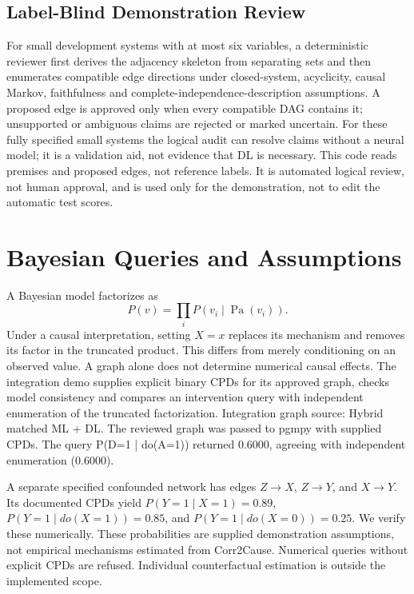 \documentclass[conference]{IEEEtran}
\begin{document}
\subsection{Label-Blind Demonstration Review}
For small development systems with at most six variables, a deterministic reviewer first derives the adjacency skeleton from separating sets and then enumerates compatible edge directions under closed-system, acyclicity, causal Markov, faithfulness and complete-independence-description assumptions. A proposed edge is approved only when every compatible DAG contains it; unsupported or ambiguous claims are rejected or marked uncertain. For these fully specified small systems the logical audit can resolve claims without a neural model; it is a validation aid, not evidence that DL is necessary. This code reads premises and proposed edges, not reference labels. It is automated logical review, not human approval, and is used only for the demonstration, not to edit the automatic test scores.

\section{Bayesian Queries and Assumptions}
A Bayesian model factorizes as
\begin{equation}
P(v)=\prod_i P(v_i\mid \operatorname{Pa}(v_i)).
\end{equation}
Under a causal interpretation, setting $X=x$ replaces its mechanism and removes its factor in the truncated product. This differs from merely conditioning on an observed value. A graph alone does not determine numerical causal effects. The integration demo supplies explicit binary CPDs for its approved graph, checks model consistency and compares an intervention query with independent enumeration of the truncated factorization. Integration graph source: Hybrid matched ML + DL.  The reviewed graph was passed to pgmpy with supplied CPDs. The query P(D=1 | do(A=1)) returned 0.6000, agreeing with independent enumeration (0.6000).

A separate specified confounded network has edges $Z\rightarrow X$, $Z\rightarrow Y$, and $X\rightarrow Y$. Its documented CPDs yield $P(Y=1\mid X=1)=0.89$, $P(Y=1\mid do(X=1))=0.85$, and $P(Y=1\mid do(X=0))=0.25$. We verify these numerically. These probabilities are supplied demonstration assumptions, not empirical mechanisms estimated from Corr2Cause. Numerical queries without explicit CPDs are refused. Individual counterfactual estimation is outside the implemented scope.
\end{document}
